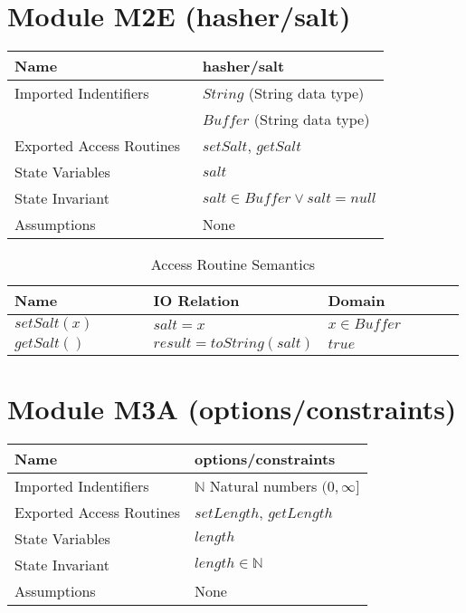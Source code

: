 \documentclass[12pt]{article}
\newcommand{\N}{\mathbb{N}}
\begin{document}
\newpage
\section{Module M2E (hasher/salt)}

\begin{table}[!htbp]
\begin{tabular}{|p{0.5\linewidth} | p{0.5\linewidth}|}
\hline
Name & hasher/salt \\
\hline
Imported Indentifiers & $String$ (String data type) \\
& $Buffer$ (String data type) \\
\hline
Exported Access Routines & $setSalt$, $getSalt$ \\
\hline
State Variables & $salt$ \\
\hline
State Invariant & $salt \in Buffer \lor salt = null$ \\
\hline
Assumptions & None \\
\hline
\end{tabular}
\end{table}

\begin{table}[!htbp]
\caption{Access Routine Semantics}
\begin{tabular}{|p{0.33\linewidth} | p{0.33\linewidth}|p{0.33\linewidth}|}
\hline
Name & IO Relation & Domain \\
\hline
$setSalt(x)$ & $salt = x$ & $x \in Buffer$ \\
\hline
$getSalt()$ & $result = toString(salt)$ & $true$ \\
\hline
\end{tabular}
\end{table}

\newpage
\section{Module M3A (options/constraints)}

\begin{table}[!htbp]
\begin{tabular}{|p{0.5\linewidth} | p{0.5\linewidth}|}
\hline
Name & options/constraints \\
\hline
Imported Indentifiers & $\N$ Natural numbers $(0, \infty]$ \\
\hline
Exported Access Routines & $setLength$, $getLength$ \\
\hline
State Variables & $length$ \\
\hline
State Invariant & $length \in \N$ \\
\hline
Assumptions & None \\
\hline
\end{tabular}
\end{table}
\end{document}
